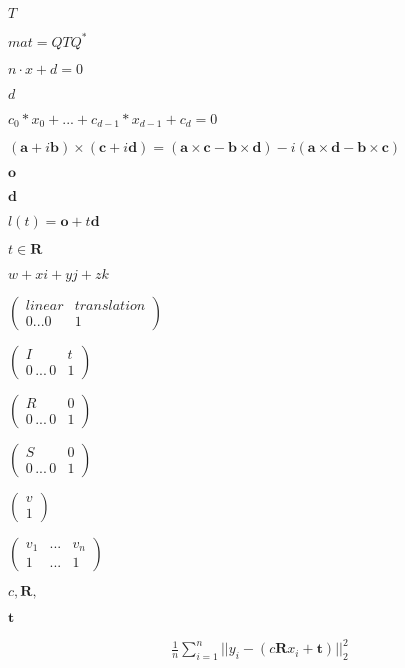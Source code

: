 \documentclass{article}
\begin{document}
$ T $
\pagebreak

$ mat = Q T Q^* $
\pagebreak

$ n \cdot x + d = 0 $
\pagebreak

$ d $
\pagebreak

$ c_0*x_0 + ... + c_{d-1}*x_{d-1} + c_d = 0 $
\pagebreak

$ (\mathbf{a}+i\mathbf{b}) \times (\mathbf{c}+i\mathbf{d}) = (\mathbf{a} \times \mathbf{c} - \mathbf{b} \times \mathbf{d}) - i(\mathbf{a} \times \mathbf{d} - \mathbf{b} \times \mathbf{c})$
\pagebreak

$ \mathbf{o} $
\pagebreak

$ \mathbf{d} $
\pagebreak

$ l(t) = \mathbf{o} + t \mathbf{d} $
\pagebreak

$ t \in \mathbf{R} $
\pagebreak

$ w+xi+yj+zk $
\pagebreak

$ \left( \begin{array}{cc}
 linear & translation\\
 0 ... 0 & 1
 \end{array} \right) $
\pagebreak

$ \left( \begin{array}{cc}
 I & t \\
 0\,...\,0 & 1
 \end{array} \right) $
\pagebreak

$ \left( \begin{array}{cc}
 R & 0\\
 0\,...\,0 & 1
 \end{array} \right) $
\pagebreak

$ \left( \begin{array}{cc}
 S & 0\\
 0\,...\,0 & 1
 \end{array} \right) $
\pagebreak

$ \left( \begin{array}{c}
 v\\
 1
 \end{array} \right) $
\pagebreak

$ \left( \begin{array}{ccc}
 v_1 & ... & v_n\\
 1 & ... & 1
 \end{array} \right) $
\pagebreak

$ c, \mathbf{R}, $
\pagebreak

$ \mathbf{t} $
\pagebreak

\begin{align*}
  \frac{1}{n} \sum_{i=1}^n \vert\vert y_i - (c\mathbf{R}x_i + \mathbf{t}) \vert\vert_2^2
\end{align*}
\pagebreak
\end{document}
